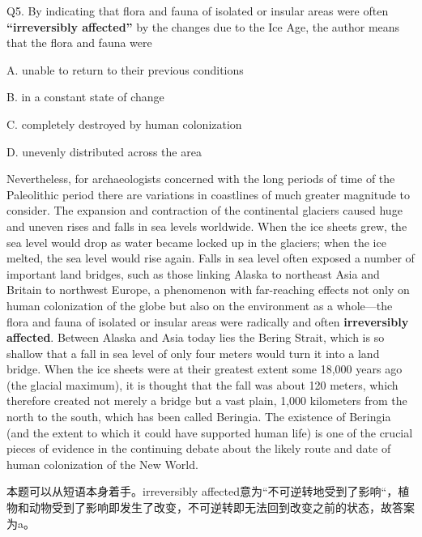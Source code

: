 \begin{blk}
    \begin{qst}
        Q5. By indicating that flora and fauna of isolated or insular areas were often \textbf{“irreversibly affected”} by the changes due to the Ice Age, the author means that the flora and fauna were
    \end{qst}

    \begin{chc}
        A. unable to return to their previous conditions

        B. in a constant state of change

        C. completely destroyed by human colonization

        D. unevenly distributed across the area
    \end{chc}

    \begin{psgq}
        Nevertheless, for archaeologists concerned with the long periods of time of the Paleolithic period there are variations in coastlines of much greater magnitude to consider. The expansion and contraction of the continental glaciers caused huge and uneven rises and falls in sea levels worldwide. When the ice sheets grew, the sea level would drop as water became locked up in the glaciers; when the ice melted, the sea level would rise again. Falls in sea level often exposed a number of important land bridges, such as those linking Alaska to northeast Asia and Britain to northwest Europe, a phenomenon with far-reaching effects not only on human colonization of the globe but also on the environment as a whole—the flora and fauna of isolated or insular areas were radically and often \textbf{irreversibly affected}. Between Alaska and Asia today lies the Bering Strait, which is so shallow that a fall in sea level of only four meters would turn it into a land bridge. When the ice sheets were at their greatest extent some 18,000 years ago (the glacial maximum), it is thought that the fall was about 120 meters, which therefore created not merely a bridge but a vast plain, 1,000 kilometers from the north to the south, which has been called Beringia. The existence of Beringia (and the extent to which it could have supported human life) is one of the crucial pieces of evidence in the continuing debate about the likely route and date of human colonization of the New World.
    \end{psgq}

    \begin{nlz}
        本题可以从短语本身着手。irreversibly affected意为“不可逆转地受到了影响“，植物和动物受到了影响即发生了改变，不可逆转即无法回到改变之前的状态，故答案为a。
    \end{nlz}
\end{blk}
